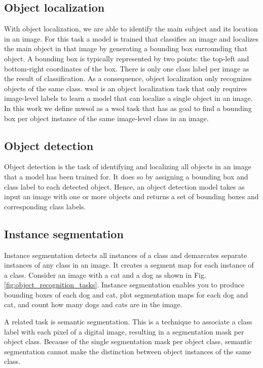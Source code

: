 \subsection{Object localization}
With object localization, we are able to identify the main subject and its location in an image. For this task a model is trained that classifies an image and localizes the main object in that image by generating a bounding box surrounding that object. A bounding box is typically represented by two points: the top-left and bottom-right coordinates of the box. There is only one class label per image as the result of classification. As a consequence, object localization only recognizes objects of the same class. \acrfull{wsol} is an object localization task that only requires image-level labels to learn a model that can localize a single object in an image. In this work we define \acrfull{mwsol} as a \acrshort{wsol} task that has as goal to find a bounding box per object instance of the same image-level class in an image.

\subsection{Object detection}
Object detection is the task of identifying and localizing all objects in an image that a model has been trained for. It does so by assigning a bounding box and class label to each detected object. Hence, an object detection model takes as input an image with one or more objects and returns a set of bounding boxes and corresponding class labels.

\subsection{Instance segmentation}
Instance segmentation detects all instances of a class and demarcates separate instances of any class in an image. It creates a segment map for each instance of a class. Consider an image with a cat and a dog as shown in Fig. \ref{fig:object_recognition_tasks}. Instance segmentation enables you to produce bounding boxes of each dog and cat, plot segmentation maps for each dog and cat, and count how many dogs and cats are in the image.

A related task is semantic segmentation. This is a technique to associate a class label with each pixel of a digital image, resulting in a segmentation mask per object class. Because of the single segmentation mask per object class, semantic segmentation cannot make the distinction between object instances of the same class.

